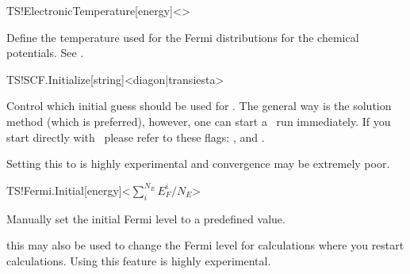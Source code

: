 \begin{fdfentry}{TS!ElectronicTemperature}[energy]<>

  Define the temperature used for the Fermi distributions for the
  chemical potentials. 
  See .

\end{fdfentry}

\begin{fdfentry}{TS!SCF.Initialize}[string]<diagon|transiesta>%

  Control which initial guess should be used for \tsiesta. The general
  way is the  solution method (which is preferred),
  however, one can start a \tsiesta\ run immediately. If you start
  directly with \tsiesta\ please refer to these flags:
  ,  and
  .
  
  \note Setting this to  is highly experimental and
  convergence may be extremely poor.

\end{fdfentry}

\begin{fdfentry}{TS!Fermi.Initial}[energy]<$\sum^{N_E}_iE_F^i/N_E$>

  Manually set the initial Fermi level to a predefined value. 

  \note this may also be used to change the Fermi level for
  calculations where you restart calculations. Using this feature is
  highly experimental.
  
\end{fdfentry}

